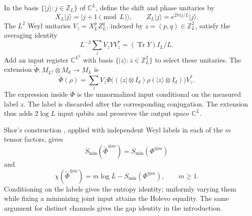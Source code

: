 \documentclass[11pt]{article}
\numberwithin{equation}{section}
\theoremstyle{boldremark}\newtheorem{remark}[theorem]{Remark}
\DeclareMathOperator{\Tr}{Tr}
\newcommand{\C}{\mathbb C}
\newcommand{\M}{M}
\newcommand{\smin}{S_{\min}}
\newcommand{\ket}[1]{\lvert #1\rangle}
\newcommand{\bra}[1]{\langle #1\rvert}
\begin{document}
In the basis $\{\ket j:j\in\mathbb Z_L\}$ of $\C^L$, define the shift
and phase unitaries by
\[
 X_L\ket j=\ket{j+1\pmod L},
 \qquad Z_L\ket j=e^{2\pi i j/L}\ket j.
\]
The $L^2$ Weyl unitaries $V_z=X_L^pZ_L^q$, indexed by
$z=(p,q)\in\mathbb Z_L^2$, satisfy the averaging identity
\begin{equation}
 L^{-2}\sum_zV_zYV_z^*=(\Tr Y)I_L/L.
 \label{eq:twirl}
\end{equation}
Add an input register $\C^{L^2}$ with basis
$\{\ket z:z\in\mathbb Z_L^2\}$ to select these unitaries. The extension
$\widetilde\Phi:\M_{L^2}\otimes\M_d\to\M_L$ is
\begin{equation}
 \widetilde\Phi(\rho)=\sum_zV_z
 \Phi\bigl((\bra z\otimes I_d)\rho(\ket z\otimes I_d)\bigr)V_z^*.
 \label{eq:extension}
\end{equation}
The expression inside $\Phi$ is the unnormalized input conditional
on the measured label $z$. The label is discarded after the
corresponding conjugation. The extension thus adds $2\log L$ input
qubits and preserves the output space $\C^L$.

Shor's construction \cite[Section~9]{Shor}, applied with independent
Weyl labels in each of the $m$ tensor factors, gives
\[
 \smin(\widetilde\Phi^{\otimes m})=\smin(\Phi^{\otimes m})
\]
and
\begin{equation}
 \chi(\widetilde\Phi^{\otimes m})
 =m\log L-\smin(\Phi^{\otimes m}),\qquad m\ge1.
 \label{eq:chi-extension}
\end{equation}
Conditioning on the labels gives the entropy identity; uniformly
varying them while fixing a minimizing joint input attains the Holevo
equality. The same argument for distinct channels gives the gap
identity in the introduction.
\end{document}
